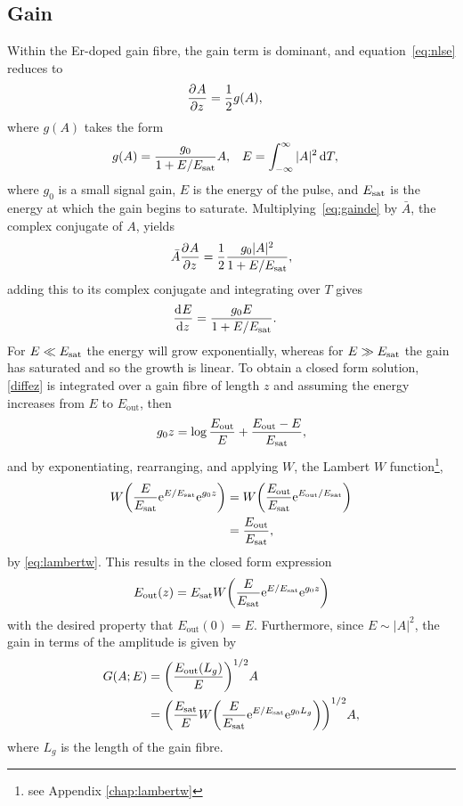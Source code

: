 \subsection{Gain}
\label{chap:gain}
Within the Er-doped gain fibre, the gain term is dominant, and equation~\eqref{eq:nlse} reduces to
\begin{align}
\label{eq:gainde}
\frac{\partial^{}A}{\partial{z}^{}} &= \frac{1}{2} g(A),
\end{align}
where $g(A)$ takes the form \cite{bohun, burgoyne2014, hausbook, haus1975, haus1991, haus1992, haus2000, kartner, peng, shtyrina, silfvast, usechak, yarutkina}
\begin{align}
\label{eq:energy}
	g(A) &= \frac{g_0}{1 + E / E_{\textrm{sat}}} A,& E &= \int_{-\infty}^\infty |A|^2 \, \textrm{d} T,
\end{align}
where $g_0$ is a small signal gain, $E$ is the energy of the pulse, and $E_{\textrm{sat}}$ is the energy at which the gain begins to saturate.
Multiplying~\eqref{eq:gainde} by $\bar{A}$, the complex conjugate of $A$, yields
\begin{align*}
	\bar{A} \frac{\partial^{}A}{\partial{z}^{}} = \frac{1}{2}\frac{g_0 |A|^2}{1 + E / E_{\textrm{sat}}},
\end{align*}
adding this to its complex conjugate and integrating over $T$ gives
\begin{align}
\label{diffez}
	\frac{\textrm{d}^{}E}{\textrm{d}{z}^{}} &= \frac{g_0 E}{1 + E / E_{\textrm{sat}}}.
\end{align}
For $E \ll E_{\textrm{sat}}$ the energy will grow exponentially, whereas for $E \gg E_{\textrm{sat}}$ the gain has saturated and so the growth is linear. To obtain a closed form solution, \eqref{diffez} is integrated over a gain fibre of length $z$ and assuming the energy increases from $E$ to $E_{\textrm{out}}$, then
\begin{align*}
	g_0 z = \log\frac{E_{\textrm{out}}}{E} + \frac{E_{\textrm{out}}-E}{E_{\textrm{sat}}},
\end{align*}
and by exponentiating, rearranging, and applying $W$, the Lambert $W$ function\footnote{see Appendix \ref{chap:lambertw}},
\begin{align*}
W \left(\frac{E}{\Es} \textrm{e}^{E/\Es} \textrm{e}^{g_0 z}\right) &= W\left(\frac{E_{\textrm{out}}}{\Es} \textrm{e}^{E_{\textrm{out}}/\Es}\right) \\
&= \frac{E_{\textrm{out}}}{\Es},
\end{align*}
by \eqref{eq:lambertw}. This results in the closed form expression
\begin{align*}
E_{\textrm{out}}(z) = \Es W \left( \frac{E}{\Es} \textrm{e}^{E/\Es} \textrm{e}^{g_0 z} \right)
\end{align*}
with the desired property that $E_{\textrm{out}}(0)=E$. Furthermore, since $E \sim |A|^2$, the gain in terms of the amplitude is given by
\begin{align*}
G(A;E) &= \left(\frac{E_{\textrm{out}}(L_g)}{E}\right)^{1/2}A \\
&= \left( \frac{\Es}{E} W \left( \frac{E}{\Es} \textrm{e}^{E/\Es} \textrm{e}^{g_0 L_g} \right) \right)^{1/2} A,
\end{align*}
where $L_g$ is the length of the gain fibre.

